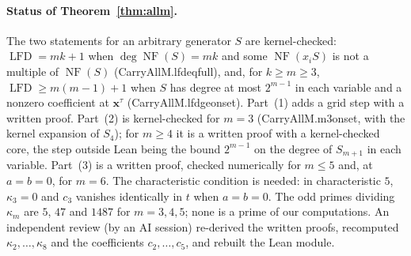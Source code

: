 \documentclass[11pt]{article}
\theoremstyle{definition}\newtheorem{definition}[theorem]{Definition}
\theoremstyle{remark}\newtheorem{remark}[theorem]{Remark}
\newcommand{\lfd}{\operatorname{LFD}}
\newcommand{\NF}{\operatorname{NF}}
\newcommand{\codeus}{\textunderscore\allowbreak}
\newcommand{\code}[1]{{\ttfamily\let\_\codeus#1}}
\begin{document}
\paragraph{Status of Theorem~\ref{thm:allm}.} The two statements for an
arbitrary generator $S$ are kernel-checked: $\lfd=mk+1$ when $\deg\NF(S)=mk$
and some $\NF(x_iS)$ is not a multiple of $\NF(S)$
(\code{CarryAllM.lfd\_eq\_full}), and, for $k\ge m\ge3$,
$\lfd\ge m(m-1)+1$ when $S$ has degree at most $2^{m-1}$ in each variable
and a nonzero coefficient at $\mathbf x^\tau$ (\code{CarryAllM.lfd\_ge\_onset}).
Part~(1) adds a grid step with a written proof. Part~(2) is kernel-checked
for $m=3$ (\code{CarryAllM.m3\_onset}, with the kernel expansion of $S_4$);
for $m\ge4$ it is a written proof with a kernel-checked core, the step
outside Lean being the bound $2^{m-1}$ on the degree of $S_{m+1}$ in each
variable. Part~(3) is a written proof, checked numerically for $m\le5$ and,
at $a=b=0$, for $m=6$. The characteristic condition is needed: in
characteristic $5$, $\kappa_3=0$ and $c_3$ vanishes identically in $t$ when
$a=b=0$. The odd primes dividing $\kappa_m$ are $5$, $47$ and $1487$ for
$m=3,4,5$; none is a prime of our computations. An independent review
(by an AI session) re-derived the written proofs, recomputed
$\kappa_2,\ldots,\kappa_8$ and the coefficients $c_2,\ldots,c_5$, and
rebuilt the Lean module.
\end{document}

